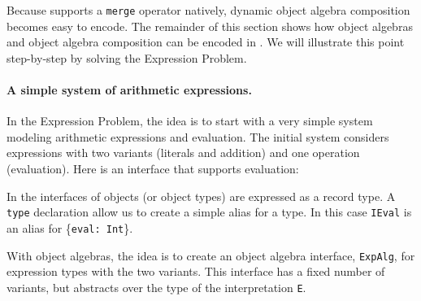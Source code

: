 Because \name supports a \lstinline{merge} operator natively, dynamic
object algebra composition becomes easy to encode. The remainder of
this section shows how object algebras and object algebra composition
can be encoded in \name. We will illustrate this point 
step-by-step by solving the Expression Problem. 
 

\paragraph{A simple system of arithmetic expressions.} 
In the Expression Problem, the idea is to start with a very simple
system modeling arithmetic expressions and evaluation.
The initial system considers expressions with two variants (literals and
addition) and one operation (evaluation). Here is an interface that supports
evaluation:
\begin{comment}
  \begin{lstlisting}{language=F2J}
    type IEval = {eval: Int};
  \end{lstlisting}
\end{comment}

\noindent In \name the interfaces of objects (or object types) are expressed as
a record type. A \lstinline{type} declaration allow us to create a
simple alias for a type.  In this case \lstinline{IEval} is an alias
for \{\lstinline{eval: Int}\}.

With object algebras, the idea is to create an object algebra
interface, \lstinline$ExpAlg$, for expression types with the two
variants. This interface has a fixed number of variants, but abstracts over the
type of the interpretation \lstinline$E$.

\begin{comment}
  \begin{lstlisting}{language=F2J}
    type ExpAlg[E] = {
      lit: Int -> E, 
      add: E -> E -> E
    };
  \end{lstlisting}
\end{comment}


